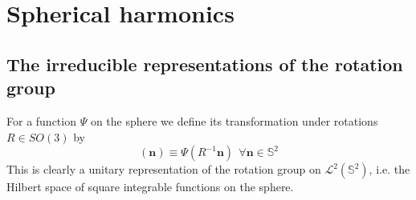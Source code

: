 \documentclass[12pt,a4paper]{article}
\renewcommand{\vec}[1]{\boldsymbol{#1}}
\begin{document}
\section{Spherical harmonics}
\subsection{The irreducible representations of the rotation group}
\cite{2008cmb..book.....D} For a function $\Psi$ on the sphere we define its transformation under rotations $R \in SO(3)$ by
\begin{equation}
[\mathcal U(R) \Psi](\vec{n}) \equiv \Psi(R^{-1} \vec{n}) ~~ \forall \vec{n} \in \mathbb{S}^2
\end{equation}
This is clearly a unitary representation of the rotation group on $\mathcal L^2 (\mathbb{S}^2)$, i.e. the Hilbert space of square integrable functions on the sphere.
\end{document}
